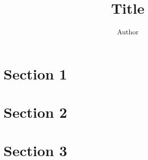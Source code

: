 \documentclass[12pt]{extarticle}
\author{\Large Author}
\title{\Huge Title}
\affiliation{\large Class
\\Degree\\Departament\\Faculty\\University\\\\\today}
\begin{document}
\maketitle

\newpage

\section{Section 1}

\newpage

\section{Section 2}

\newpage

\section{Section 3}
\end{document}
